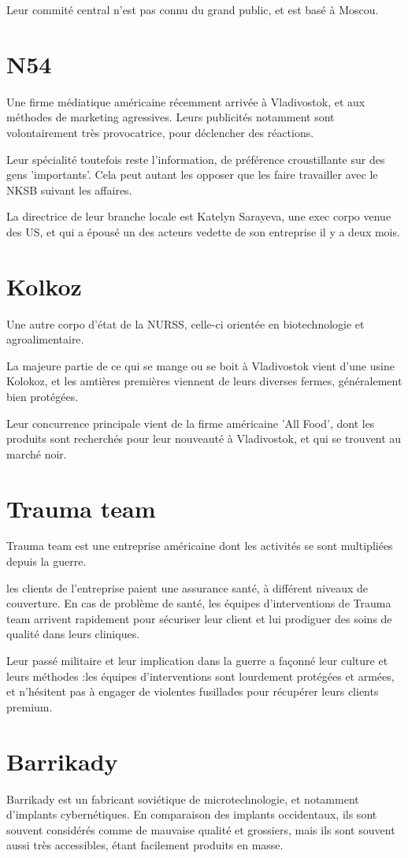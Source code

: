 \documentclass[10pt,a4paper]{book}
\begin{document}
Leur commité central n'est pas connu du grand public, et est basé à Moscou.
\section{N54}
Une firme médiatique américaine récemment arrivée à Vladivostok, et aux méthodes de marketing agressives. Leurs publicités notamment sont volontairement très provocatrice, pour déclencher des réactions.

Leur spécialité toutefois reste l'information, de préférence croustillante sur des gens 'importants'. Cela peut autant les opposer que les faire travailler avec le NKSB suivant les affaires.

La directrice de leur branche locale est Katelyn Sarayeva, une exec corpo venue des US, et qui a épousé un des acteurs vedette de son entreprise il y a deux mois.
\section{Kolkoz}
Une autre corpo d'état de la NURSS, celle-ci orientée en biotechnologie et agroalimentaire.

La majeure partie de ce qui se mange ou se boit à Vladivostok vient d'une usine Kolokoz, et les amtières premières viennent de leurs diverses fermes, généralement bien protégées.

Leur concurrence principale vient de la firme américaine 'All Food', dont les produits sont recherchés pour leur nouveauté à Vladivostok, et qui se trouvent au marché noir.
\section{Trauma team}
Trauma team est une entreprise américaine dont les activités se sont multipliées depuis la guerre.

les clients de l'entreprise paient une assurance santé, à différent niveaux de couverture. En cas de problème de santé, les équipes d'interventions de Trauma team arrivent rapidement pour sécuriser leur client et lui prodiguer des soins de qualité dans leurs cliniques.

Leur passé militaire et leur implication dans la guerre a façonné leur culture et leurs méthodes :les équipes d'interventions sont lourdement protégées et armées, et n'hésitent pas à engager de violentes fusillades pour récupérer leurs clients premium.
\section{Barrikady}
Barrikady est un fabricant soviétique de microtechnologie, et notamment d'implants cybernétiques. En comparaison des implants occidentaux, ils sont souvent considérés comme de mauvaise qualité et grossiers, mais ils sont souvent aussi très accessibles, étant facilement produits en masse.
\end{document}
